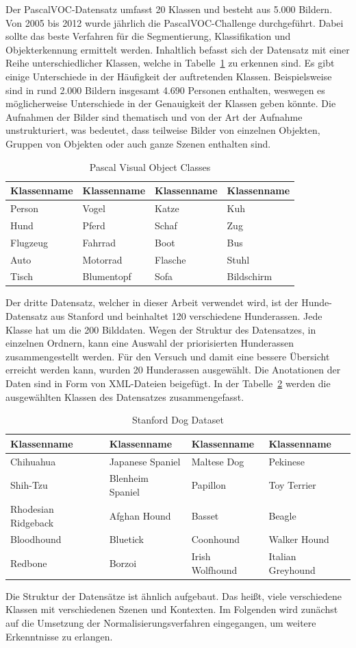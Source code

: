 Der PascalVOC-Datensatz umfasst 20 Klassen und besteht aus 5.000 Bildern. Von 2005 bis 2012 wurde jährlich die PascalVOC-Challenge durchgeführt. Dabei sollte das beste Verfahren für die Segmentierung, Klassifikation und Objekterkennung ermittelt werden. Inhaltlich befasst sich der Datensatz mit einer Reihe unterschiedlicher Klassen, welche in Tabelle~\ref{tab:pvoc} zu erkennen sind. Es gibt einige Unterschiede in der Häufigkeit der auftretenden Klassen. Beispielsweise sind in rund 2.000 Bildern insgesamt 4.690 Personen enthalten, weswegen es möglicherweise Unterschiede in der Genauigkeit der Klassen geben könnte. Die Aufnahmen der Bilder sind thematisch und von der Art der Aufnahme unstrukturiert, was bedeutet, dass teilweise Bilder von einzelnen Objekten, Gruppen von Objekten oder auch ganze Szenen enthalten sind.
\begin{table}
[h]
\caption{Pascal Visual Object Classes \cite{pascal-voc-2007}}
\centering
\begin{tabular}{|l|l|l|l|}
\hline
Klassenname & Klassenname & Klassenname & Klassenname\\
\hline
Person & Vogel & Katze & Kuh\\
Hund & Pferd & Schaf & Zug\\
Flugzeug & Fahrrad & Boot & Bus\\
Auto & Motorrad & Flasche & Stuhl\\
Tisch & Blumentopf & Sofa & Bildschirm\\
\hline
\end{tabular}
\label{tab:pvoc}
\end{table}
Der dritte Datensatz, welcher in dieser Arbeit verwendet wird, ist der Hunde-Datensatz aus Stanford und beinhaltet 120 verschiedene Hunderassen. Jede Klasse hat um die 200 Bilddaten. Wegen der Struktur des Datensatzes, in einzelnen Ordnern, kann eine Auswahl der priorisierten Hunderassen zusammengestellt werden. Für den Versuch und damit eine bessere Übersicht erreicht werden kann, wurden 20 Hunderassen ausgewählt. Die Anotationen der Daten sind in Form von XML-Dateien beigefügt. In der Tabelle~\ref{tab:sdd} werden die ausgewählten Klassen des Datensatzes zusammengefasst.
\begin{table}
[h]
\caption{Stanford Dog Dataset \cite{KhoslaYaoJayadevaprakashFeiFei_FGVC2011}}
\label{tab:sdd}
\centering
\begin{tabular}{|l|l|l|l|}
\hline
Klassenname & Klassenname & Klassenname & Klassenname\\
\hline
Chihuahua & Japanese Spaniel & Maltese Dog & Pekinese\\
Shih-Tzu & Blenheim Spaniel & Papillon & Toy Terrier\\
Rhodesian Ridgeback & Afghan Hound & Basset & Beagle\\
Bloodhound & Bluetick & Coonhound & Walker Hound\\
Redbone & Borzoi & Irish Wolfhound & Italian Greyhound\\
\hline
\end{tabular}
\end{table}
Die Struktur der Datensätze ist ähnlich aufgebaut. Das heißt, viele verschiedene Klassen mit verschiedenen Szenen und Kontexten. Im Folgenden wird zunächst auf die Umsetzung der Normalisierungsverfahren eingegangen, um weitere Erkenntnisse zu erlangen.
